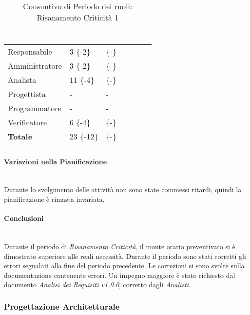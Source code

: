\begin{longtable}{| C{.30\textwidth}| C{.15\textwidth}| C{.20\textwidth}|}
\hline
{}\textbf{\textcolor{white}{Ruolo}} & \textbf{\textcolor{white}{Ore}} & \textbf{\textcolor{white}{Costo in \euro}} \\
\hline 
Responsabile & 3 \{-2\} &  \{-\}\\
\hline
{}Amministratore & 3 \{-2\} &  \{-\} \\
\hline
Analista & 11 \{-4\} &  \{-\} \\
\hline
{}Progettista & - & - \\
\hline
Programmatore & - & - \\
\hline
{}Verificatore & 6 \{-4\} &  \{-\}\\
\hline
\textbf{Totale} & 23 \{-12\} &  \{-\} \\
\hline
\caption{Consuntivo di Periodo dei ruoli: Risanamento Criticità 1}
\label{Distribuzione oraria Ruoli del Periodo di rc1}
\end{longtable}

\paragraph{Variazioni nella Pianificazione} ~\\
Durante lo svolgimento delle attività non sono state commessi ritardi, quindi la pianificazione è rimasta invariata. \\

\paragraph{Conclusioni} ~\\

Durante il periodo di \textit{Risanamento Criticità}, il monte orario preventivato si è dimostrato superiore alle reali necessità. Durante il periodo sono stati corretti gli errori segnalati alla fine del periodo precedente. Le correzioni si sono svolte sulla documentazione contenente errori. Un impegno maggiore è stato richiesto dal documento \textit{Analisi dei Requisiti v1.0.0}, corretto dagli \textit{Analisti}. \\

\newpage

\subsubsection{Progettazione Architetturale}
\label{pa}


